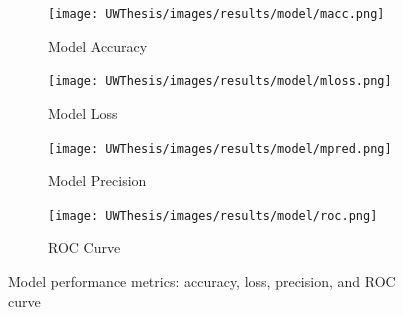 \documentclass [11pt, proquest] {uwthesis}[2020/02/24]
\begin{document}
\begin{figure}[H]
  \centering
  \begin{subfigure}[b]{0.48\textwidth}
    \texttt{[image: UWThesis/images/results/model/macc.png]}
    \caption{Model Accuracy}
    \label{fig:image1}
  \end{subfigure}
  \hspace{0.02\textwidth}
  \begin{subfigure}[b]{0.48\textwidth}
    \texttt{[image: UWThesis/images/results/model/mloss.png]}
    \caption{Model Loss}
    \label{fig:image2}
  \end{subfigure}

  \vspace{0.3cm}

  \begin{subfigure}[b]{0.48\textwidth}
    \texttt{[image: UWThesis/images/results/model/mpred.png]}
    \caption{Model Precision}
    \label{fig:image3}
  \end{subfigure}
  \hspace{0.02\textwidth}
  \begin{subfigure}[b]{0.48\textwidth}
    \texttt{[image: UWThesis/images/results/model/roc.png]}
    \caption{ROC Curve}
    \label{fig:image4}
  \end{subfigure}

  \caption{Model performance metrics: accuracy, loss, precision, and ROC curve}
  \label{fig:model_metrics_quadrant}
\end{figure}
\end{document}
